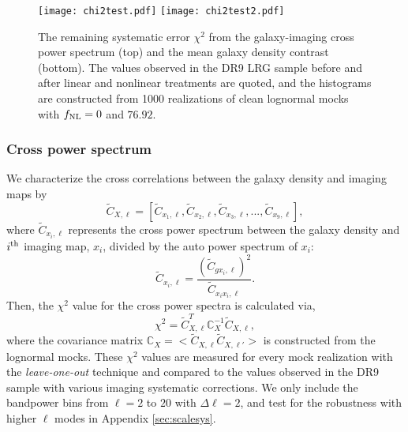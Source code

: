 \begin{figure}
\raggedleft
\texttt{[image: chi2test.pdf]}
\texttt{[image: chi2test2.pdf]}
\caption{The remaining systematic error $\chi^{2}$ from the galaxy-imaging cross power spectrum (top) and the mean galaxy density contrast (bottom). The values observed in the DR9 LRG sample before and after linear and nonlinear treatments are quoted, and the histograms are constructed from 1000 realizations of clean lognormal mocks with $f_{\rm NL}=0$ and $76.92$. }\label{fig:chi2test}
\end{figure}


\subsubsection{Cross power spectrum}

We characterize the cross correlations between the galaxy density and imaging  maps by 
\begin{equation}
\tilde{C}_{X, \ell} = [\tilde{C}_{x_{1}, \ell}, \tilde{C}_{x_{2}, \ell}, \tilde{C}_{x_{3}, \ell}, ..., \tilde{C}_{x_{9}, \ell}],
\end{equation}
where $\tilde{C}_{x_{i}, \ell}$ represents  the cross power spectrum between the galaxy density and $i^{\rm th}$ imaging map, $x_{i}$, divided by the auto power spectrum of $x_{i}$:
\begin{equation}
\tilde{C}_{x_{i}, \ell} = \frac{(\tilde{C}_{gx_{i}, \ell})^{2}}{\tilde{C}_{x_{i}x_{i},\ell}}.
\end{equation}
Then, the $\chi^{2}$ value for the cross power spectra is calculated via,
\begin{equation}
\chi^{2} = \tilde{C}^{T}_{X, \ell} \mathbb{C}_{X}^{-1} \tilde{C}_{X, \ell},
\end{equation}
where the covariance matrix $\mathbb{C}_{X} = < \tilde{C}_{X, \ell} \tilde{C}_{X, \ell'} >$ is constructed from the lognormal mocks. These $\chi^{2}$ values are measured for every mock realization with the \textit{leave-one-out} technique and compared to the values observed in the DR9 sample with various imaging systematic corrections.   We only include the bandpower bins from $\ell=2$ to $20$ with $\Delta\ell=2$, and test for the robustness with higher $\ell$ modes in Appendix \ref{sec:scalesys}. 

